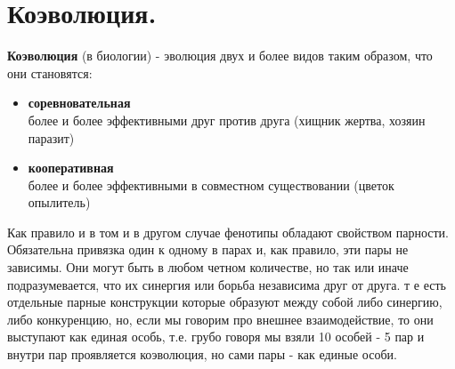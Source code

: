 \section{Коэволюция.}
\textbf{Коэволюция} (в биологии) - эволюция двух и более видов таким образом, что они становятся:
\begin{itemize}
    \item \textbf{соревновательная}\\
    более и более эффективными друг против друга (хищник жертва, хозяин паразит)
    \item \textbf{кооперативная}\\
    более и более эффективными в совместном существовании (цветок опылитель)
\end{itemize}
Как правило и в том и в другом случае фенотипы обладают свойством парности.
Обязательна привязка один к одному в парах и, как правило, эти пары не зависимы.
Они могут быть в любом четном количестве, но так или иначе подразумевается, что их синергия или борьба независима друг от друга. т е есть отдельные парные конструкции которые образуют между собой либо синергию, либо конкуренцию, но, если мы говорим про внешнее взаимодействие, то они выступают как единая особь, т.е. грубо говоря мы взяли 10 особей - 5 пар и внутри пар проявляется коэволюция, но сами пары - как единые особи. \\

